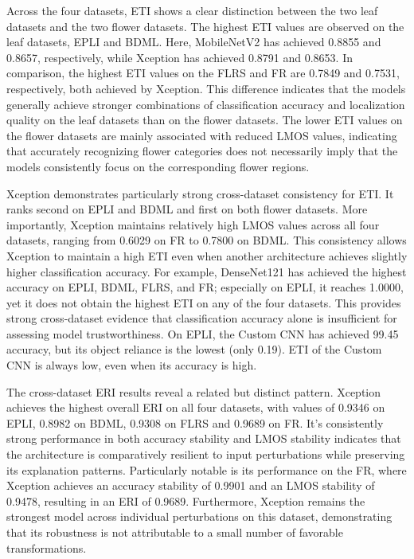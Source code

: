 \documentclass[a4paper,fleqn]{cas-dc}
\begin{document}
Across the four datasets, ETI shows a clear distinction between the two leaf datasets and the two flower datasets. The highest ETI values are observed on the leaf datasets, EPLI and BDML. Here, MobileNetV2 has achieved 0.8855 and 0.8657, respectively, while Xception has achieved 0.8791 and 0.8653. In comparison, the highest ETI values on the FLRS and FR are 0.7849 and 0.7531, respectively, both achieved by Xception. This difference indicates that the models generally achieve stronger combinations of classification accuracy and localization quality on the leaf datasets than on the flower datasets. The lower ETI values on the flower datasets are mainly associated with reduced LMOS values, indicating that accurately recognizing flower categories does not necessarily imply that the models consistently focus on the corresponding flower regions.

Xception demonstrates particularly strong cross-dataset consistency for ETI. It ranks second on EPLI and BDML and first on both flower datasets. More importantly, Xception maintains relatively high LMOS values across all four datasets, ranging from 0.6029 on FR to 0.7800 on BDML. This consistency allows Xception to maintain a high ETI even when another architecture achieves slightly higher classification accuracy. For example, DenseNet121 has achieved the highest accuracy on EPLI, BDML, FLRS, and FR; especially on EPLI, it reaches 1.0000, yet it does not obtain the highest ETI on any of the four datasets. This provides strong cross-dataset evidence that classification accuracy alone is insufficient for assessing model trustworthiness. On EPLI, the Custom CNN has achieved 99.45 accuracy, but its object reliance is the lowest (only 0.19). ETI of the Custom CNN is always low, even when its accuracy is high. 

The cross-dataset ERI results reveal a related but distinct pattern. Xception achieves the highest overall ERI on all four datasets, with values of 0.9346 on EPLI, 0.8982 on BDML, 0.9308 on FLRS and 0.9689 on FR. %
It's consistently strong performance in both accuracy stability and LMOS stability indicates that the architecture is comparatively resilient to input perturbations while preserving its explanation patterns. Particularly notable is its performance on the FR, where Xception achieves an accuracy stability of 0.9901 and an LMOS stability of 0.9478, resulting in an ERI of 0.9689. Furthermore, Xception remains the strongest model across individual perturbations on this dataset, demonstrating that its robustness is not attributable to a small number of favorable transformations. 
\end{document}
